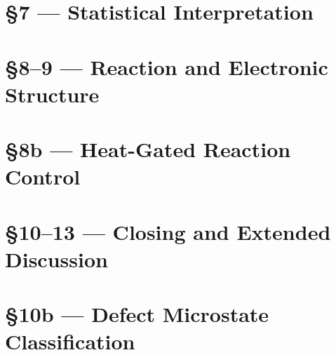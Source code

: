 \documentclass[11pt, letterpaper, oneside]{report}
\begin{document}
\chapter{\S7 --- Statistical Interpretation}
\label{ch:s7}


\chapter{\S8--9 --- Reaction and Electronic Structure}
\label{ch:s89}


\chapter{\S8b --- Heat-Gated Reaction Control}
\label{ch:s8b}


\chapter{\S10--13 --- Closing and Extended Discussion}
\label{ch:s1013}


\chapter{\S10b --- Defect Microstate Classification}
\label{ch:s10b}


\end{document}
